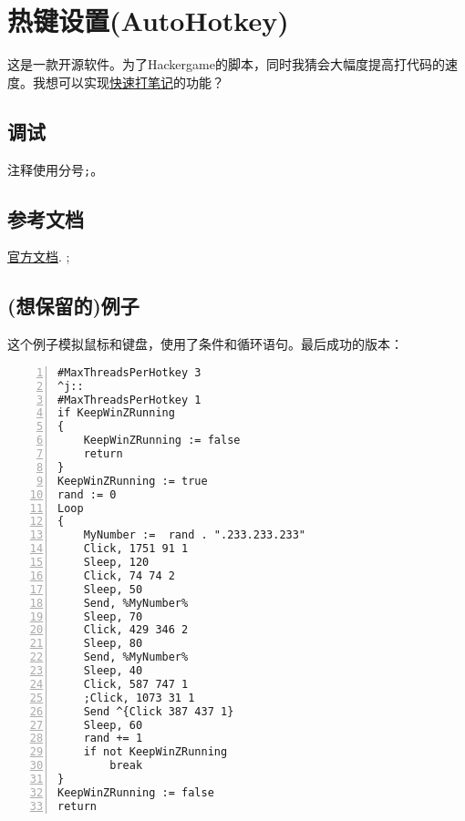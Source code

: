 \documentclass[11pt]{amsart}
\begin{document}
\section{热键设置(AutoHotkey)}
这是一款开源软件。为了Hackergame的脚本，同时我猜会大幅度提高打代码的速度。我想可以实现\href{https://zhuanlan.zhihu.com/p/60049290}{快速打笔记}的功能？
\subsection{调试}

注释使用分号\lstinline|;|。

\subsection{参考文档}
\href{https://wyagd001.github.io/zh-cn/docs/AutoHotkey.htm}{官方文档}.
;
\subsection{(想保留的)例子}
这个例子模拟鼠标和键盘，使用了条件和循环语句。最后成功的版本：
\begin{lstlisting}[numbers=left,numberstyle=\tiny,numbersep=10pt]
#MaxThreadsPerHotkey 3
^j::  
#MaxThreadsPerHotkey 1
if KeepWinZRunning  
{
    KeepWinZRunning := false  
    return  
}
KeepWinZRunning := true
rand := 0
Loop
{
    MyNumber :=  rand . ".233.233.233"
	Click, 1751 91 1
	Sleep, 120
	Click, 74 74 2
	Sleep, 50	
	Send, %MyNumber%
	Sleep, 70	
	Click, 429 346 2
	Sleep, 80
	Send, %MyNumber%
	Sleep, 40
	Click, 587 747 1
	;Click, 1073 31 1
	Send ^{Click 387 437 1}
	Sleep, 60	
	rand += 1
    if not KeepWinZRunning  
        break  
}
KeepWinZRunning := false  
return
\end{lstlisting}
\end{document}

